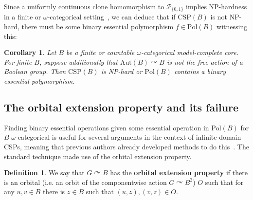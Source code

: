 \documentclass{article}
\newtheorem{corollary}[theorem]{Corollary}
\theoremstyle{remark}
\theoremstyle{definition}
\newtheorem{definition}[theorem]{Definition}
\def\acts{\curvearrowright}
\begin{document}
Since a uniformly continuous  clone homomorphism to $\mathcal{P}_{\{0,1\}}$  implies NP-hardness in a finite or $\omega$-categorical setting~\cite[Theorem 28]{Topo-Birk}, we can deduce that if $\mathrm{CSP}(B)$ is not NP-hard, there must be some binary essential polymorphism $f\in\mathrm{Pol}(B)$ witnessing this:

\begin{corollary} Let $B$ be a finite or countable $\omega$-categorical  model-complete core. For finite $B$, suppose additionally  that   $\mathrm{Aut}(B)\acts B$ is not the free action of a Boolean group.  Then $\mathrm{CSP}(B)$ is NP-hard   or  $\mathrm{Pol}(B)$ contains a binary essential polymorphism. 
\end{corollary}


\subsection{The orbital extension property and its failure}\label{sub:OEP}

Finding binary essential operations given some essential operation in $\mathrm{Pol}(B)$ for $B$ $\omega$-categorical is useful for several arguments in the context of infinite-domain CSPs, meaning that previous authors already developed methods to do this~\cite{BodKara, Smoothapp, bodirsky2020complexity, minrandom}. The standard technique made use of the orbital extension property.

\begin{definition}\label{def:OEP} We say that $G\acts B$ has the \textbf{orbital extension property} if there is an orbital (i.e. an orbit of the componentwise action $G\acts B^2$) $O$ such that for any $u,v\in B$ there is $z\in B$ such that $(u,z), (v,z)\in O$. 
\end{definition}
\end{document}
